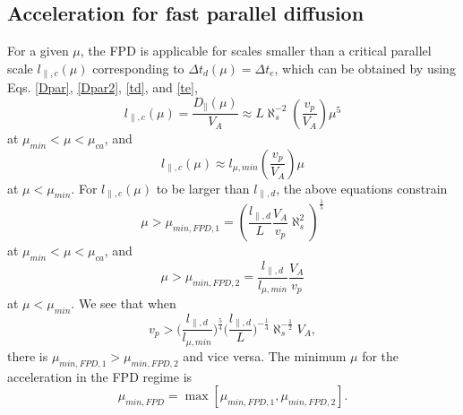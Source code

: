 \documentclass[preprint2,twocolumn,times,tighten]{aastex63}
\begin{document}
{\subsection{Acceleration for fast parallel diffusion}




For a given $\mu$, 
the FPD is applicable for scales smaller than a critical parallel scale $l_{\|,c}(\mu)$ corresponding to $\Delta t_d(\mu) = \Delta t_e$, 
which can be obtained by using Eqs. \eqref{Dpar}, \eqref{Dpar2}, 
\eqref{td}, and \eqref{te},
\begin{equation}
    l_{\|,c} (\mu)= \frac{D_{\|} (\mu)}{V_A} \approx L  \aleph_s^{-2} \left(\frac{v_p}{V_A}\right) \mu^{5}
    \label{lb}
\end{equation}
at $\mu_{min}<\mu<\mu_{ca}$, and 
\begin{equation}
   l_{\|,c}(\mu) \approx   l_{\mu,min} \left(\frac{v_p}{V_A}\right)\mu
\end{equation}
at $\mu<\mu_{min}$.
{For $l_{\|,c}(\mu)$ to be larger than $l_{\|,d}$, 
the above equations constrain 
\begin{equation}
   \mu > \mu_{min,FPD,1} = \left(\frac{l_{\|,d}}{L}\frac{V_A}{v_p} \aleph_s^{2}  \right)^\frac{1}{5}
\end{equation}
at $\mu_{min} < \mu < \mu_{ca}$, and 
\begin{equation}
   \mu> \mu_{min,FPD,2} = \frac{l_{\|,d}}{l_{\mu,min}}\frac{V_A}{v_p}
\end{equation}
at $\mu< \mu_{min}$.}
We see that when 
\begin{equation}
     v_p > \Big(\frac{l_{\|,d}}{l_{\mu,min}}\Big)^\frac{5}{4} \Big(\frac{l_{\|,d}}{L}\Big)^{-\frac{1}{4}}
     \aleph_s^{-\frac{1}{2}} V_A,
\end{equation}
there is $\mu_{min,FPD,1}>\mu_{min,FPD,2}$ and vice versa.
The minimum $\mu$ for the acceleration in the FPD regime is 
\begin{equation}
  \mu_{min,FPD} = \max[\mu_{min,FPD,1},\mu_{min,FPD,2}].
\end{equation}


}
\end{document}
